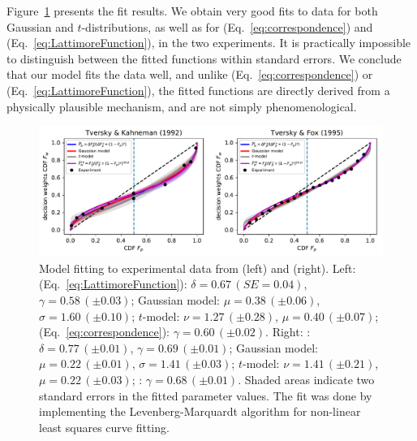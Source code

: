 \documentclass[a4paper, 12pt]{article}
\newcommand{\eref}[1]{(Eq.~\ref{eq:#1})}
\newcommand{\flabel}[1]{\label{fig:#1}}
\newcommand{\Fref}[1]{Figure~\ref{fig:#1}}
\begin{document}
\Fref{TK_TF_fit} presents the fit results. We obtain very good fits to data for both Gaussian and $t$-distributions, as well as for \eref{correspondence} and \eref{LattimoreFunction}, in the two experiments. It is practically impossible to distinguish between the fitted functions within standard errors. We conclude that our model fits the data well, and unlike \eref{correspondence} or \eref{LattimoreFunction}, the fitted functions are directly derived from a physically plausible mechanism, and are not simply phenomenological.

\begin{figure}[htb]
\centering
\includegraphics[width=1.0\textwidth]{./figs/TK_TF_curvefit.pdf}
\caption{Model fitting to experimental data from \cite{TverskyKahneman1992} (left) and \cite{TverskyFox1995} (right).
Left: \cite{LattimoreBakerWitte1992} \eref{LattimoreFunction}: $\delta=0.67\,\left(SE = 0.04\right)$, $\gamma=0.58\,\left(\pm0.03\right)$; Gaussian model: $\mu=0.38\,\left(\pm0.06\right)$, $\sigma=1.60\,\left(\pm0.10\right)$; $t$-model: $\nu=1.27\,\left(\pm0.28\right)$, $\mu=0.40\,\left(\pm0.07\right)$; \cite{TverskyKahneman1992} \eref{correspondence}: $\gamma=0.60\,\left(\pm0.02\right)$. Right: \cite{LattimoreBakerWitte1992}: $\delta=0.77\,\left(\pm0.01\right)$, $\gamma=0.69\,\left(\pm0.01\right)$; Gaussian model: $\mu=0.22\,\left(\pm0.01\right)$, $\sigma=1.41\,\left(\pm0.03\right)$; $t$-model: $\nu=1.41\,\left(\pm0.21\right)$, $\mu=0.22\,\left(\pm0.03\right)$; \cite{TverskyKahneman1992}: $\gamma=0.68\,\left(\pm0.01\right)$. Shaded areas indicate two standard errors in the fitted parameter values. The fit was done by implementing the Levenberg-Marquardt algorithm \cite{Levenberg1944} for non-linear least squares curve fitting.
}
\flabel{TK_TF_fit}
\end{figure}

\FloatBarrier
\end{document}
